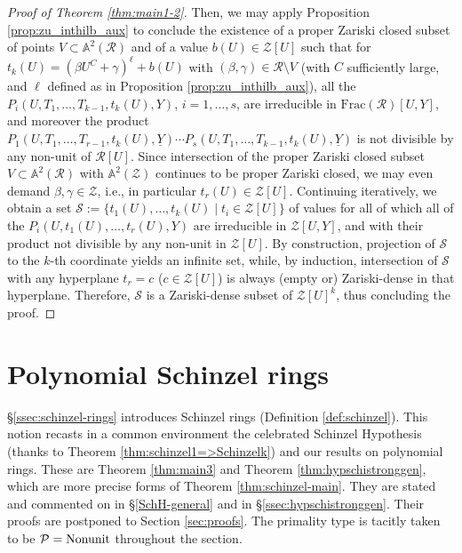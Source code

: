 \documentclass[11pt,a4paper,reqno]{amsart}
\theoremstyle{definition}
\begin{document}
\begin{proof}[Proof of Theorem \ref{thm:main1-2}]
Then, we may apply Proposition \ref{prop:zu_inthilb_aux} to conclude the existence of a proper Zariski closed subset of points $V\subset \mathbb{A}^2(\mathcal R)$ and of a value $b(U)\in \mathcal Z[U]$ such that 
for $t_k(U)=(\beta U^C+\gamma)^\ell + b(U)$ with $(\beta,\gamma)\in \mathcal R\setminus V$ (with $C$ sufficiently large, and $\ell$ defined as in Proposition \ref{prop:zu_inthilb_aux}), 
 all the $P_i(U, T_1,\dots, T_{k-1}, t_k(U),Y)$, $i=1,\dots, s$, are irreducible in $\textrm{Frac}(\mathcal R)[U, Y]$, and moreover the product $P_1(U, T_1,\dots, T_{r-1}, t_k(U),\underline{Y})\cdots P_s(U,T_1,\dots, T_{k-1}, t_k(U),\underline{Y})$
 is not divisible by any non-unit of $\mathcal R[U]$. Since intersection of the proper Zariski closed subset $V\subset \mathbb{A}^2(\mathcal R)$ with $\mathbb{A}^2(\mathcal Z)$ continues to be proper Zariski closed, we may even demand $\beta,\gamma\in \mathcal Z$, i.e., in particular $t_r(U)\in \mathcal Z[U]$. 
Continuing iteratively, we obtain a set $\mathcal{S}:=\{t_1(U),\dots, t_k(U)\mid t_i\in \mathcal Z[U]\}$ 
%
%
of values %
for all of which all of the $P_i(U,t_1(U),\dots, t_r(U),Y)$ are irreducible in $\mathcal Z[U,Y]$, and with their product not divisible by any non-unit in $\mathcal Z[U]$. By construction, projection of $\mathcal{S}$ to the $k$-th coordinate yields an infinite set, while, by induction, intersection of $\mathcal{S}$ with any hyperplane $t_r=c$ ($c\in \mathcal Z[U]$) is always (empty or) Zariski-dense in that hyperplane.
%
%
Therefore, $\mathcal{S}$ is a Zariski-dense subset of $\mathcal Z[U]^k$, 
thus concluding the proof.
\end{proof}
\fi


\section{Polynomial Schinzel rings} \label{sec:applications}

 \S \ref{ssec:schinzel-rings} introduces Schinzel rings (Definition \ref{def:schinzel}). This notion recasts in a common environment the celebrated Schinzel Hypothesis (thanks to Theorem \ref{thm:schinzel1=>Schinzelk}) and our results on polynomial rings. These are Theorem \ref{thm:main3} and Theorem \ref{thm:hypschistronggen}, which are more precise forms of Theorem \ref{thm:schinzel-main}.
 They are stated and commented on in \S \ref{SchH-general} and in \S \ref{ssec:hypschistronggen}. Their proofs are postponed to Section \ref{sec:proofs}.
The primality type is tacitly taken to be ${\mathcal P} = {\rm Nonunit}$ throughout the section.
 
\end{document}
